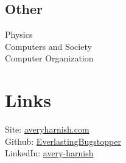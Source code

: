 \documentclass[letterpaper]{deedy-resume} %
\begin{document}
\begin{minipage}[t]{0.35\textwidth}
\sectionspace

\subsection{Other}
Physics\\
Computers and Society\\
Computer Organization


\sectionspace %



\section*{Links} 

Site: \href{https://averyharnish.com}{averyharnish.com} \\
Github: \href{https://github.com/EverlastingBugstopper}{EverlastingBugstopper} \\
LinkedIn: \href{https://linkedin.com/in/avery-harnish}{avery-harnish} \\


\sectionspace %


\end{minipage} %
\hfill
%
%
\end{document}
